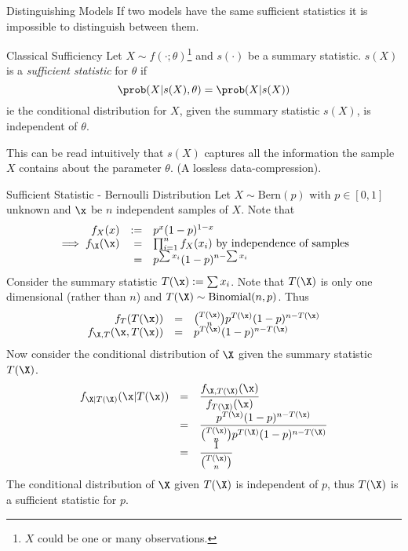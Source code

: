\documentclass[11pt,a4paper]{article}
\begin{document}
  \begin{remark}{Distinguishing Models}
    If two models have the same sufficient statistics it is impossible to distinguish between them.
  \end{remark}

  \begin{definition}{Classical Sufficiency}
    Let $X\sim f(\cdot;\theta)$\footnote{$X$ could be one or many observations.} and $s(\cdot)$ be a summary statistic. $s(X)$ is a \textit{sufficient statistic} for $\theta$ if
    \[ \prob(X|s(X),\theta)=\prob(X|s(X)) \]
    ie the conditional distribution for $X$, given the summary statistic $s(X)$, is independent of $\theta$.
    \par This can be read intuitively that $s(X)$ captures all the information the sample $X$ contains about the parameter $\theta$. (A lossless data-compression).
  \end{definition}

  \begin{example}{Sufficient Statistic - Bernoulli Distribution}
    Let $X\sim\text{Bern}(p)$ with $p\in[0,1]$ unknown and $\x$ be $n$ independent samples of $X$. Note that
    \[\begin{array}{rrl}
      f_X(x)&:=&p^x(1-p)^{1-x}\\
      \implies f_\X(\x)&=&\prod_{i=1}^nf_X(x_i)\text{ by independence of samples}\\
      &=&p^{\sum x_i}(1-p)^{n-\sum x_i}
    \end{array}\]
    Consider the summary statistic $T(\x):=\sum x_i$. Note that $T(\X)$ is only one dimensional (rather than $n$) and ${T(\X)\sim\text{Binomial}(n,p)}$. Thus
    \[\begin{array}{rcl}
      f_T(T(\x))&=&{T(\x)\choose n}p^{T(\x)}(1-p)^{n-T(\x)}\\
      f_{\X,T}(\x,T(\x))&=&p^{T(\x)}(1-p)^{n-T(\x)}
    \end{array}\]
    Now consider the conditional distribution of $\X$ given the summary statistic $T(\X)$.
    \[\begin{array}{rcl}
      f_{\X|T(\X)}(\x|T(\x))&=&\dfrac{f_{\X,T(\X)}(\x)}{f_{T(\X)}(\x)}\\
      &=&\dfrac{p^{T(\x)}(1-p)^{n-T(\x)}}{{T(\x)\choose n}p^{T(\X)}(1-p)^{n-T(\X)}}\\
      &=&\dfrac1{{T(\x)\choose n}}
    \end{array}\]
    The conditional distribution of $\X$ given $T(\X)$ is independent of $p$, thus $T(\X)$ is a sufficient statistic for $p$.
  \end{example}
\end{document}
